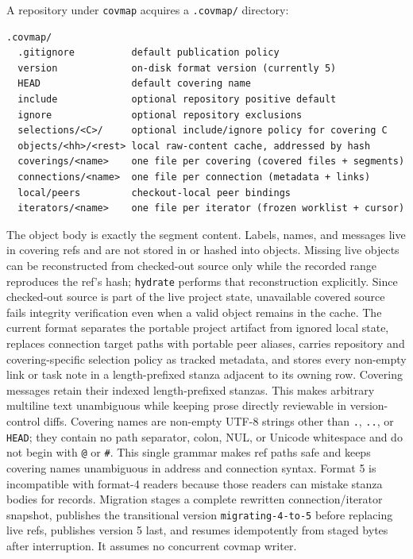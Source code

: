 \documentclass[11pt,a4paper]{article}
\begin{document}
A repository under \texttt{covmap} acquires a \texttt{.covmap/}
directory:
\begin{verbatim}
.covmap/
  .gitignore          default publication policy
  version             on-disk format version (currently 5)
  HEAD                default covering name
  include             optional repository positive default
  ignore              optional repository exclusions
  selections/<C>/     optional include/ignore policy for covering C
  objects/<hh>/<rest> local raw-content cache, addressed by hash
  coverings/<name>    one file per covering (covered files + segments)
  connections/<name>  one file per connection (metadata + links)
  local/peers         checkout-local peer bindings
  iterators/<name>    one file per iterator (frozen worklist + cursor)
\end{verbatim}
The object body is exactly the segment content. Labels, names,
and messages live in covering refs and are not stored in or hashed into
objects. Missing live objects can be reconstructed from checked-out source
only while the recorded range reproduces the ref's hash; \texttt{hydrate}
performs that reconstruction explicitly. Since checked-out source is part of
the live project state, unavailable covered source fails integrity verification
even when a valid object remains in the cache. The current format separates
the portable project artifact from ignored local state, replaces connection
target paths with portable peer aliases, carries repository and
covering-specific selection policy as tracked metadata, and stores every
non-empty link or task note in a length-prefixed stanza adjacent to its
owning row. Covering messages retain their indexed length-prefixed stanzas.
This makes arbitrary multiline text unambiguous while keeping prose directly
reviewable in version-control diffs. Covering names are
non-empty UTF-8 strings other than \texttt{.}, \texttt{..}, or
\texttt{HEAD}; they contain no path separator, colon, NUL, or Unicode
whitespace and do not begin with \texttt{@} or \texttt{\#}. This single
grammar makes ref paths safe and keeps covering names unambiguous in address
and connection syntax.
Format 5 is incompatible with format-4 readers because those readers can
mistake stanza bodies for records. Migration stages a complete rewritten
connection/iterator snapshot, publishes the transitional version
\texttt{migrating-4-to-5} before replacing live refs, publishes version 5
last, and resumes idempotently from staged bytes after interruption. It
assumes no concurrent covmap writer.
\end{document}
